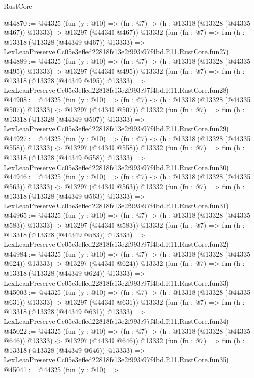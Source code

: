 \begin{lexlean}{RustCore}
\begin{coremodule}
@44870 := @44325
    (fun (y : @10) =>
    (fn : @7) -> (h : @13318 (@13328 (@44335 @467)) @13333) -> @13297 (@44340 @467))
    @13332
    (fun (fn : @7) =>
    fun (h : @13318 (@13328 (@44349 @467)) @13333) =>
    LexLeanPreserve.Cc05e3effed22818fe13e2f993e97f4bd.R11.RustCore.fun27)
@44889 := @44325
    (fun (y : @10) =>
    (fn : @7) -> (h : @13318 (@13328 (@44335 @495)) @13333) -> @13297 (@44340 @495))
    @13332
    (fun (fn : @7) =>
    fun (h : @13318 (@13328 (@44349 @495)) @13333) =>
    LexLeanPreserve.Cc05e3effed22818fe13e2f993e97f4bd.R11.RustCore.fun28)
@44908 := @44325
    (fun (y : @10) =>
    (fn : @7) -> (h : @13318 (@13328 (@44335 @507)) @13333) -> @13297 (@44340 @507))
    @13332
    (fun (fn : @7) =>
    fun (h : @13318 (@13328 (@44349 @507)) @13333) =>
    LexLeanPreserve.Cc05e3effed22818fe13e2f993e97f4bd.R11.RustCore.fun29)
@44927 := @44325
    (fun (y : @10) =>
    (fn : @7) -> (h : @13318 (@13328 (@44335 @558)) @13333) -> @13297 (@44340 @558))
    @13332
    (fun (fn : @7) =>
    fun (h : @13318 (@13328 (@44349 @558)) @13333) =>
    LexLeanPreserve.Cc05e3effed22818fe13e2f993e97f4bd.R11.RustCore.fun30)
@44946 := @44325
    (fun (y : @10) =>
    (fn : @7) -> (h : @13318 (@13328 (@44335 @563)) @13333) -> @13297 (@44340 @563))
    @13332
    (fun (fn : @7) =>
    fun (h : @13318 (@13328 (@44349 @563)) @13333) =>
    LexLeanPreserve.Cc05e3effed22818fe13e2f993e97f4bd.R11.RustCore.fun31)
@44965 := @44325
    (fun (y : @10) =>
    (fn : @7) -> (h : @13318 (@13328 (@44335 @583)) @13333) -> @13297 (@44340 @583))
    @13332
    (fun (fn : @7) =>
    fun (h : @13318 (@13328 (@44349 @583)) @13333) =>
    LexLeanPreserve.Cc05e3effed22818fe13e2f993e97f4bd.R11.RustCore.fun32)
@44984 := @44325
    (fun (y : @10) =>
    (fn : @7) -> (h : @13318 (@13328 (@44335 @624)) @13333) -> @13297 (@44340 @624))
    @13332
    (fun (fn : @7) =>
    fun (h : @13318 (@13328 (@44349 @624)) @13333) =>
    LexLeanPreserve.Cc05e3effed22818fe13e2f993e97f4bd.R11.RustCore.fun33)
@45003 := @44325
    (fun (y : @10) =>
    (fn : @7) -> (h : @13318 (@13328 (@44335 @631)) @13333) -> @13297 (@44340 @631))
    @13332
    (fun (fn : @7) =>
    fun (h : @13318 (@13328 (@44349 @631)) @13333) =>
    LexLeanPreserve.Cc05e3effed22818fe13e2f993e97f4bd.R11.RustCore.fun34)
@45022 := @44325
    (fun (y : @10) =>
    (fn : @7) -> (h : @13318 (@13328 (@44335 @646)) @13333) -> @13297 (@44340 @646))
    @13332
    (fun (fn : @7) =>
    fun (h : @13318 (@13328 (@44349 @646)) @13333) =>
    LexLeanPreserve.Cc05e3effed22818fe13e2f993e97f4bd.R11.RustCore.fun35)
@45041 := @44325
    (fun (y : @10) =>

\end{coremodule}
\end{lexlean}
